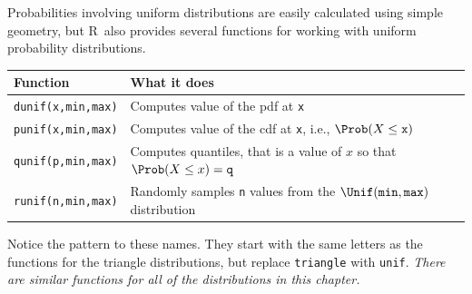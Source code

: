 \documentclass[twoside]{book}\usepackage[]{graphicx}\usepackage[]{xcolor}
\def\R{{\sf R}}
\begin{document}
Probabilities involving uniform distributions are easily calculated using simple geometry,
but \R\ also provides several functions for working with uniform probability distributions.

\begin{center}
\begin{tabular}{ll}
	\hline
	Function & What it does \\
	\hline
	\texttt{dunif(x,min,max)} & Computes value of the pdf at \texttt{x}
	\\
	\texttt{punif(x,min,max)} & Computes value of the cdf at \texttt{x}, i.e., 
	$\Prob(X \le \texttt{x})$
	\\
	\texttt{qunif(p,min,max)} & Computes quantiles, that is a value of $x$ so that 
								$\Prob(X \le x) = \texttt{q}$
    \\
	\texttt{runif(n,min,max)} & Randomly samples \texttt{n} values from the 
								$\Unif(\texttt{min}, \texttt{max})$ distribution
	\\
	\hline
\end{tabular}
\end{center}

Notice the pattern to these names.  They start with the same letters as 
the functions for the triangle distributions, but replace \texttt{triangle}
with \texttt{unif}.  \emph{There are similar functions for all of the distributions
in this chapter.}
\end{document}
